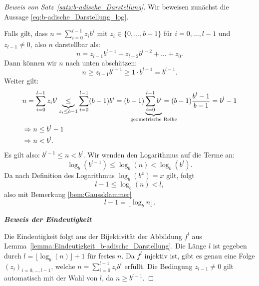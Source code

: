 \documentclass{article}
\begin{document}
    \begin{proof}[Beweis von Satz~\ref{satz:b-adische_Darstellung}] 

      Wir beweisen zunächst die Aussage \eqref{eq:b-adische_Darstellung_log}. 

      Falls gilt, dass $n=\sum_{i=0}^{l-1} z_i b^i$ mit $z_i \in \{0, \dots, b-1\}$ für $i = 0, \dots, l-1$ und $z_{l-1} \neq 0$, also $n$ darstellbar als:
      \begin{equation*}
        n = z_{l-1}b^{l-1} + z_{l-2}b^{l-2} + \dots + z_0.
      \end{equation*}
      Dann können wir $n$ nach unten abschätzen:
      \begin{equation*}
        n \geq z_{l-1}b^{l-1} \geq 1 \cdot b^{l-1} = b^{l-1}.
      \end{equation*}
      Weiter gilt:
      \begin{align*}
        &n = \sum_{i=0}^{l-1} z_ib^i \underbrace{\leq}_{z_i \leq b-1} \sum_{i=0}^{l-1} (b-1)b^i = (b-1) \underbrace{\sum_{i=0}^{l-1} b^i}_{\mathclap{\text{geometrische Reihe}}} = (b-1) \frac{b^l-1}{b-1} = b^l-1 \\
        &\Rightarrow n \leq b^l -1 \\
        &\Rightarrow n < b^l.
      \end{align*}
      Es gilt also: $b^{l-1} \leq n < b^l$. 
      Wir wenden den Logarithmus auf die Terme an: 
      \begin{equation*}
        \log_b(b^{l-1}) \leq \log_b(n) < \log_b(b^l).
      \end{equation*}
      Da nach Definition des Logarithmus $\log_b(b^x) = x$ gilt, folgt
      \begin{equation*}
        l-1 \leq \log_b(n) < l,
      \end{equation*}
      also mit Bemerkung \ref{bem:Gaussklammer}
      \begin{equation*}
        l-1 = \lfloor \log_b n \rfloor.
      \end{equation*}

      \noindent\textbf{\textit{Beweis der Eindeutigkeit}}

      Die Eindeutigkeit folgt aus der Bijektivität der Abbildung $f^l$ aus Lemma~\ref{lemma:Eindeutigkeit_b-adische_Darstellung}.
      Die Länge $l$ ist gegeben durch $l= \lfloor \log_b(n) \rfloor +1$ für festes $n$. 
      Da $f^l$ injektiv ist, gibt es genau eine Folge $(z_i)_{i=0,\dots,l-1}$, welche $n=\sum_{i=0}^{l-1} z_ib^i$ erfüllt.
      Die Bedingung $z_{l-1} \neq 0$ gilt automatisch mit der Wahl von $l$, da $n \geq b^{l-1}$.


\end{proof}
\end{document}
